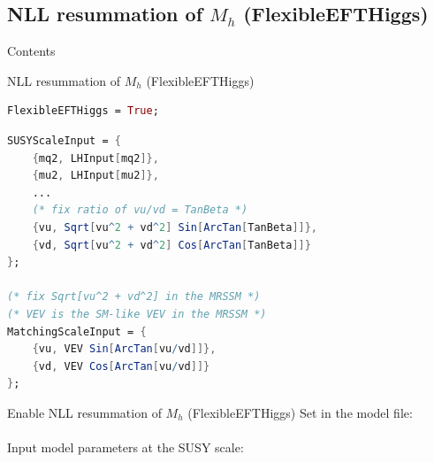 \documentclass[hyperref={pdfpagelabels=false},ngerman]{beamer}
\newcommand{\SM}{\ensuremath{\text{SM}}}
\newcommand{\MRSSM}{\ensuremath{\text{MRSSM}}}
\begin{document}
\subsection{NLL resummation of $M_h$ (FlexibleEFTHiggs)}

\begin{frame}{Contents}
  \tableofcontents[currentsubsection,sectionstyle=show/shaded]  
\end{frame}

\begin{frame}{NLL resummation of $M_h$ (FlexibleEFTHiggs)}
  \begin{center}
  \end{center}
\end{frame}

\begin{lrbox}{\listbox}\begin{lstlisting}[language=Mathematica]
FlexibleEFTHiggs = True;
\end{lstlisting}\end{lrbox} %

\begin{lrbox}{\listboxt}\begin{lstlisting}[language=Mathematica]
SUSYScaleInput = {
    {mq2, LHInput[mq2]},
    {mu2, LHInput[mu2]},
    ...
    (* fix ratio of vu/vd = TanBeta *)
    {vu, Sqrt[vu^2 + vd^2] Sin[ArcTan[TanBeta]]},
    {vd, Sqrt[vu^2 + vd^2] Cos[ArcTan[TanBeta]]}
};

(* fix Sqrt[vu^2 + vd^2] in the MRSSM *)
(* VEV is the SM-like VEV in the MRSSM *)
MatchingScaleInput = {
    {vu, VEV Sin[ArcTan[vu/vd]]},
    {vd, VEV Cos[ArcTan[vu/vd]]}
};
\end{lstlisting}\end{lrbox} %

\begin{frame}{Enable NLL resummation of $M_h$ (FlexibleEFTHiggs)}
  Set in the model file:\\[1em]
  \usebox{\listbox}
  \\[1em]
  Input model parameters at the SUSY scale:
  \\[1.5em]
  \usebox{\listboxt}
\end{frame}
\end{document}
